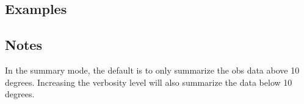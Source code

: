 \subsection{Examples}

\subsection{Notes}
In the summary mode, the
default is to only summarize the obs data above 10 degrees. Increasing the
verbosity level will also summarize the data below 10 degrees.

%

